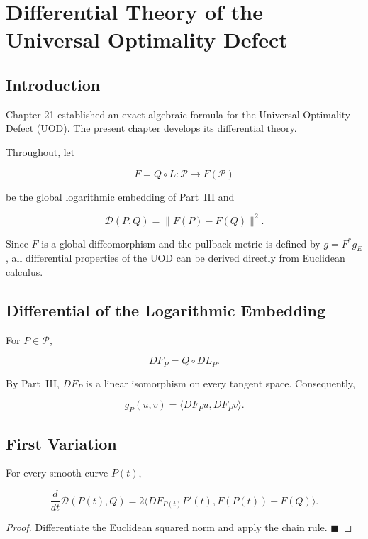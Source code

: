 \chapter[Differential Theory of the UOD]{Differential Theory of the Universal Optimality Defect}

\section{Introduction}

Chapter 21 established an exact algebraic formula for the Universal
Optimality Defect (UOD). The present chapter develops its differential
theory.

Throughout, let

\[
F=Q\circ L:\mathcal P\rightarrow F(\mathcal P)
\]

be the global logarithmic embedding of Part~III and

\[
\mathcal D(P,Q)=\|F(P)-F(Q)\|^{2}.
\]

Since \(F\) is a global diffeomorphism and the pullback metric is defined
by \(g=F^{*}g_E\), all differential properties of the UOD can be derived
directly from Euclidean calculus.

\section{Differential of the Logarithmic Embedding}

For \(P\in\mathcal P\),

\[
DF_P=Q\circ DL_P.
\]

By Part~III, \(DF_P\) is a linear isomorphism on every tangent space.
Consequently,

\[
g_P(u,v)=\langle DF_Pu,DF_Pv\rangle.
\]

\section{First Variation}

\begin{theorem}
\label{ch:thm:22-1}
For every smooth curve \(P(t)\),

\[
\frac{d}{dt}\mathcal D(P(t),Q)=
2\langle DF_{P(t)}P'(t),F(P(t))-F(Q)\rangle.
\]
\end{theorem}

\begin{proof}
Differentiate the Euclidean squared norm and apply the chain rule.
$\blacksquare$
\end{proof}

